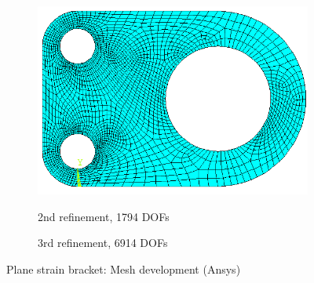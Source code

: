 \begin{figure}[h!]
\begin{subfigure}[b]{0.48\linewidth}
{            \includegraphics{adaptivity/ex_images/ex_adp_bracket_ansys_1227.png}
        }
        \caption{2nd refinement, 1794 DOFs}
    \end{subfigure}
    \begin{subfigure}[b]{0.48\linewidth}
        \centering
        \caption{3rd refinement, 6914 DOFs}
    \end{subfigure}
    \caption{Plane strain bracket: Mesh development (Ansys)}
    \label{adap_fig:ex_bracket_mesh_ansys}
\end{figure}
